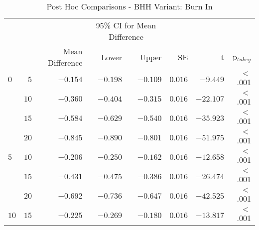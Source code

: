 \begin{table}[htbp]
	\centering
	\caption{Post Hoc Comparisons - BHH Variant: Burn In}
	\label{tab:results:burn_in:post_hoc}%
	\par\bigskip
	\resizebox{\textwidth}{!}
	{
		\begin{tabular}{lrrrrrrr}
			\toprule
			\multicolumn{1}{c}{} & \multicolumn{1}{c}{} & \multicolumn{1}{c}{} & \multicolumn{2}{c}{95\% CI for Mean Difference} & \multicolumn{1}{c}{} & \multicolumn{1}{c}{} & \multicolumn{1}{c}{}               \\
			\cline{4-5}
			$ $                  & $ $                  & Mean Difference      & Lower                                           & Upper                & SE                   & t                    & p$_{tukey}$ \\
			\cmidrule[0.4pt]{1-8}
			$0$                  & $5$                  & $-0.154$             & $-0.198$                                        & $-0.109$             & $0.016$              & $-9.449$             & $<$ .001    \\
			$ $                  & $10$                 & $-0.360$             & $-0.404$                                        & $-0.315$             & $0.016$              & $-22.107$            & $<$ .001    \\
			                     & $15$                 & $-0.584$             & $-0.629$                                        & $-0.540$             & $0.016$              & $-35.923$            & $<$ .001    \\
			                     & $20$                 & $-0.845$             & $-0.890$                                        & $-0.801$             & $0.016$              & $-51.975$            & $<$ .001    \\
			$5$                  & $10$                 & $-0.206$             & $-0.250$                                        & $-0.162$             & $0.016$              & $-12.658$            & $<$ .001    \\
			$ $                  & $15$                 & $-0.431$             & $-0.475$                                        & $-0.386$             & $0.016$              & $-26.474$            & $<$ .001    \\
			                     & $20$                 & $-0.692$             & $-0.736$                                        & $-0.647$             & $0.016$              & $-42.525$            & $<$ .001    \\
			$10$                 & $15$                 & $-0.225$             & $-0.269$                                        & $-0.180$             & $0.016$              & $-13.817$            & $<$ .001    \\

\end{tabular}}
\end{table}
